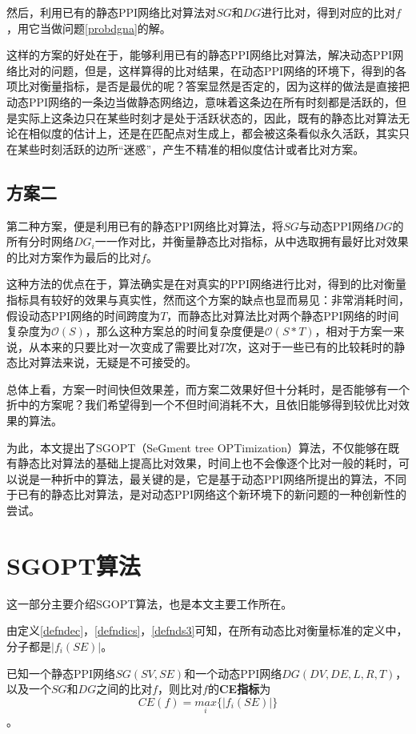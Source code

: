 然后，利用已有的静态PPI网络比对算法对$SG$和$DG$进行比对，得到对应的比对$f$，用它当做问题\ref{probdgna}的解。

这样的方案的好处在于，能够利用已有的静态PPI网络比对算法，解决动态PPI网络比对的问题，但是，这样算得的比对结果，在动态PPI网络的环境下，得到的各项比对衡量指标，是否是最优的呢？答案显然是否定的，因为这样的做法是直接把动态PPI网络的一条边当做静态网络边，意味着这条边在所有时刻都是活跃的，但是实际上这条边只在某些时刻才是处于活跃状态的，因此，既有的静态比对算法无论在相似度的估计上，还是在匹配点对生成上，都会被这条看似永久活跃，其实只在某些时刻活跃的边所“迷惑”，产生不精准的相似度估计或者比对方案。
\subsection{方案二}
第二种方案，便是利用已有的静态PPI网络比对算法，将$SG$与动态PPI网络$DG$的所有分时网络$DG_i$一一作对比，并衡量静态比对指标，从中选取拥有最好比对效果的比对方案作为最后的比对$f$。

这种方法的优点在于，算法确实是在对真实的PPI网络进行比对，得到的比对衡量指标具有较好的效果与真实性，然而这个方案的缺点也显而易见：非常消耗时间，假设动态PPI网络的时间跨度为$T$，而静态比对算法比对两个静态PPI网络的时间复杂度为$\mathcal{O}(S)$，那么这种方案总的时间复杂度便是$\mathcal{O}(S*T)$，相对于方案一来说，从本来的只要比对一次变成了需要比对$T$次，这对于一些已有的比较耗时的静态比对算法来说，无疑是不可接受的。

总体上看，方案一时间快但效果差，而方案二效果好但十分耗时，是否能够有一个折中的方案呢？我们希望得到一个不但时间消耗不大，且依旧能够得到较优比对效果的算法。

为此，本文提出了SGOPT（SeGment tree OPTimization）算法，不仅能够在既有静态比对算法的基础上提高比对效果，时间上也不会像逐个比对一般的耗时，可以说是一种折中的算法，最关键的是，它是基于动态PPI网络所提出的算法，不同于已有的静态比对算法，是对动态PPI网络这个新环境下的新问题的一种创新性的尝试。
\section{SGOPT算法}
这一部分主要介绍SGOPT算法，也是本文主要工作所在。

由定义\ref{defndec}，\ref{defndics}，\ref{defnds3}可知，在所有动态比对衡量标准的定义中，分子都是$|f_i(SE)|$。

\begin{defn}[CE指标]
\label{defnce}
已知一个静态PPI网络$SG(SV,SE)$和一个动态PPI网络$DG(DV,DE,L,R,T)$，以及一个$SG$和$DG$之间的比对$f$，则比对$f$的\textbf{CE指标}为$$CE(f)=\underset{i}{max}\{ |f_i(SE)|\}$$。
\end{defn}

